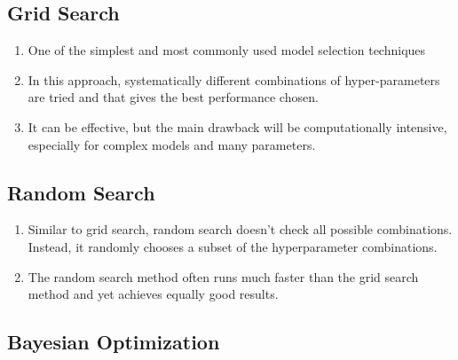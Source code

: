 \subsection{Grid Search}

\begin{enumerate}
    \item One of the simplest and most commonly used model selection techniques
    \hfill \cite{geeksforgeeks/machine-learning/model-selection-for-machine-learning}

    \item In this approach, systematically different combinations of hyper-parameters are tried and that gives the best performance chosen.
    \hfill \cite{geeksforgeeks/machine-learning/model-selection-for-machine-learning}

    \item It can be effective, but the main drawback will be computationally intensive, especially for complex models and many parameters.
    \hfill \cite{geeksforgeeks/machine-learning/model-selection-for-machine-learning}
\end{enumerate}



\subsection{Random Search}

\begin{enumerate}
    \item Similar to grid search, random search doesn't check all possible combinations. Instead, it randomly chooses a subset of the hyperparameter combinations.
    \hfill \cite{geeksforgeeks/machine-learning/model-selection-for-machine-learning}

    \item The random search method often runs much faster than the grid search method and yet achieves equally good results.
    \hfill \cite{geeksforgeeks/machine-learning/model-selection-for-machine-learning}
\end{enumerate}



\subsection{Bayesian Optimization}

